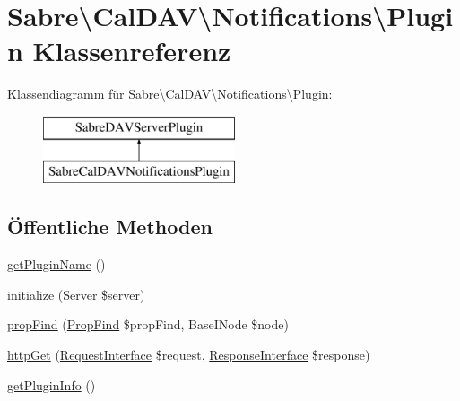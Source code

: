 \hypertarget{class_sabre_1_1_cal_d_a_v_1_1_notifications_1_1_plugin}{}\section{Sabre\textbackslash{}Cal\+D\+AV\textbackslash{}Notifications\textbackslash{}Plugin Klassenreferenz}
\label{class_sabre_1_1_cal_d_a_v_1_1_notifications_1_1_plugin}
Klassendiagramm für Sabre\textbackslash{}Cal\+D\+AV\textbackslash{}Notifications\textbackslash{}Plugin\+:\begin{figure}[H]
\begin{center}
\leavevmode
\includegraphics[height=2.000000cm]{class_sabre_1_1_cal_d_a_v_1_1_notifications_1_1_plugin}
\end{center}
\end{figure}
\subsection*{Öffentliche Methoden}
\begin{DoxyCompactItemize}
\item 
\mbox{\hyperlink{class_sabre_1_1_cal_d_a_v_1_1_notifications_1_1_plugin_ae5ad126289787eca8c0f8ffc44b6afc7}{get\+Plugin\+Name}} ()
\item 
\mbox{\hyperlink{class_sabre_1_1_cal_d_a_v_1_1_notifications_1_1_plugin_a0533b4b740abd9f0b9880efc41b99242}{initialize}} (\mbox{\hyperlink{class_sabre_1_1_d_a_v_1_1_server}{Server}} \$server)
\item 
\mbox{\hyperlink{class_sabre_1_1_cal_d_a_v_1_1_notifications_1_1_plugin_afe5c2113cdf8ba5c86cb966cc61a1835}{prop\+Find}} (\mbox{\hyperlink{class_sabre_1_1_d_a_v_1_1_prop_find}{Prop\+Find}} \$prop\+Find, Base\+I\+Node \$node)
\item 
\mbox{\hyperlink{class_sabre_1_1_cal_d_a_v_1_1_notifications_1_1_plugin_a3c35045fc42619bd7095bfcec7fc5e75}{http\+Get}} (\mbox{\hyperlink{interface_sabre_1_1_h_t_t_p_1_1_request_interface}{Request\+Interface}} \$request, \mbox{\hyperlink{interface_sabre_1_1_h_t_t_p_1_1_response_interface}{Response\+Interface}} \$response)
\item 
\mbox{\hyperlink{class_sabre_1_1_cal_d_a_v_1_1_notifications_1_1_plugin_ae4ae94078bdf6b64250e05cdb6a8aed4}{get\+Plugin\+Info}} ()
\end{DoxyCompactItemize}
